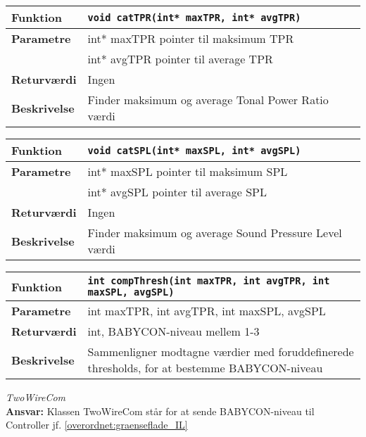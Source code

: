 \begin{center}
    \begin{tabular}{ | l | p{} |}
    \hline
    \textbf{Funktion}	& \verb+void catTPR(int* maxTPR, int* avgTPR) +						\\ \hline
    \textbf{Parametre} 	& int* maxTPR pointer til maksimum TPR\\&
    						  int* avgTPR pointer til average TPR			\\ \hline
    \textbf{Returværdi}	& Ingen	 								\\ \hline
    \textbf{Beskrivelse}& Finder maksimum og average Tonal Power Ratio værdi		\\ \hline
    \end{tabular}
\end{center}

\begin{center}
    \begin{tabular}{ | l | p{} |}
    \hline
    \textbf{Funktion}	& \verb+void catSPL(int* maxSPL, int* avgSPL) +						\\ \hline
    \textbf{Parametre} 	& int* maxSPL pointer til maksimum SPL\\&
    						  int* avgSPL pointer til average SPL			\\ \hline
    \textbf{Returværdi}	& Ingen	 								\\ \hline
    \textbf{Beskrivelse}& Finder maksimum og average Sound Pressure Level værdi		\\ \hline
    \end{tabular}
\end{center}

\begin{center}
    \begin{tabular}{ | l | p{} |}
    \hline
    \textbf{Funktion}	& \verb+int compThresh(int maxTPR, int avgTPR, int maxSPL, avgSPL) +						\\ \hline
    \textbf{Parametre} 	& int maxTPR, int avgTPR, int maxSPL, avgSPL			\\ \hline
    \textbf{Returværdi}	& int, BABYCON-niveau mellem 1-3 								\\ \hline
    \textbf{Beskrivelse}& Sammenligner modtagne værdier med foruddefinerede thresholds, for at bestemme BABYCON-niveau		\\ \hline
    \end{tabular}
\end{center}


\textit{TwoWireCom} \\
\textbf{Ansvar:} Klassen TwoWireCom står for at sende BABYCON-niveau til Controller jf. \ref{overordnet:graenseflade_IL}

